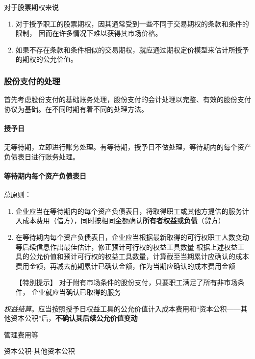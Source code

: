 \documentclass[UTF8,12pt]{ctexart}
\newenvironment{Dr}{%
	\begin{list}{}%
		{
			\setlength{\leftmargin}{2em}
			\setlength{\labelwidth}{2em}
			\setlength{\labelsep}{0pt}
			\setlength{\itemindent}{0pt}
			\setlength{\listparindent}{0pt}
			\setlength{\parsep}{0pt}
			\setlength{\topsep}{0pt}
		}
		\item[\textbf{借：}]
	}{%
	\end{list}
}
\newenvironment{Cr}{%
	\begin{list}{}%
		{
			\setlength{\leftmargin}{3em}
			\setlength{\labelwidth}{2em}
			\setlength{\labelsep}{0pt}
			\setlength{\itemindent}{0pt}
			\setlength{\listparindent}{0pt}
			\setlength{\parsep}{0pt}
			\setlength{\topsep}{0pt}
		}
		\item[\textbf{贷：}]
	}{%
	\end{list}
}
\numberwithin{equation}{section} %
\numberwithin{figure}{section}
\numberwithin{table}{section}
\begin{document}
	对于股票期权来说
	\begin{enumerate}
		\item 对于授予职工的股票期权，因其通常受到一些不同于交易期权的条款和条件的限制， 因而在许多情况下难以获得其市场价格。
		
		\item 如果不存在条款和条件相似的交易期权，就应通过期权定价模型来估计所授予的期权的公允价值。
	\end{enumerate}

	\subsubsection{股份支付的处理}
	首先考虑股份支付的基础账务处理，股份支付的会计处理以完整、有效的股份支付协议为基础。在不同时期有着不同的处理方法。
	
	\paragraph{授予日}
	无等待期，立即进行账务处理。有等待期，授予日不做处理，等待期内的每个资产负债表日进行账务处理。
	
	\paragraph{等待期内每个资产负债表日}
	总原则：
	\begin{enumerate}
		\item 企业应当在等待期内的每个资产负债表日，将取得职工或其他方提供的服务计入成本费用（借方），同时按相同金额确认\textbf{所有者权益或负债}（贷方）
		
		\item 在等待期内每个资产负债表日，企业应当根据最新取得的可行权职工人数变动等后续信息作出最佳估计，修正预计可行权的权益工具数量
		根据上述权益工具的公允价值和预计可行权的权益工具数量，计算截至当期累计应确认的成本费用金额，再减去前期累计已确认金额，作为当期应确认的成本费用金额
		
		【特别提示】
		对于附有市场条件的股份支付，只要职工满足了所有非市场条件， 企业就应当确认已取得的服务
		
	\end{enumerate}

	\textit{权益结算}。应当按照授予日权益工具的公允价值计入成本费用和“资本公积——其他资本公积”后，\textbf{不确认其后续公允价值变动}
	
	\begin{Dr}
		管理费用等
	\end{Dr}
	\begin{Cr}
		资本公积-其他资本公积
	\end{Cr}
	
\end{document}
